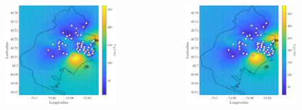\begin{frame}
	\centering
	\begin{columns}
		\begin{column}{0.33\linewidth}
			\centering
			\begin{figure}
				\includegraphics[width=\textwidth]{../Tesi/Immagini/4. Caso di studio/Kriging/Mappa volume, 4}
			\end{figure}
		\end{column}
		\begin{column}{0.33\linewidth}
			\centering
			\begin{figure}
				\includegraphics[width=\textwidth]{../Tesi/Immagini/4. Caso di studio/Kriging/Mappa volume, 5}

\end{figure}
\end{column}
\end{columns}
\end{frame}
